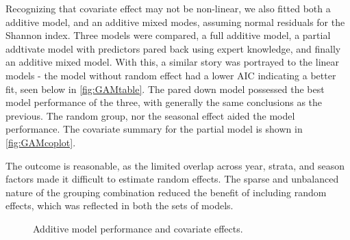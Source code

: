 \documentclass[12pt]{article}
\begin{document}
Recognizing that covariate effect may not be non-linear, we also fitted both a
additive model, and an additive mixed modes, assuming normal residuals for
the Shannon index. Three models were compared, a full additive model, a partial
addtivate model with predictors pared back using expert knowledge, and finally
an additive mixed model. With this, a similar story was portrayed to the linear models
- the model without random effect had a lower AIC indicating a better fit, seen
below in \ref{fig:GAMtable}. The pared down model possessed the best model
performance of the three, with generally the same conclusions as the previous.
The random group, nor the seasonal effect aided the model performance. The
covariate summary for the partial model is shown in \ref{fig:GAMcoplot}.

The outcome is reasonable, as the limited overlap across year, strata, and season
factors made it difficult to estimate random effects. The sparse and unbalanced
nature of the grouping combination reduced the benefit of including random
effects, which was reflected in both the sets of models. 


\begin{figure}[H]
    \centering

    \caption{Additive model performance and covariate effects.}
    \label{fig:additive-models}
\end{figure}
\end{document}
